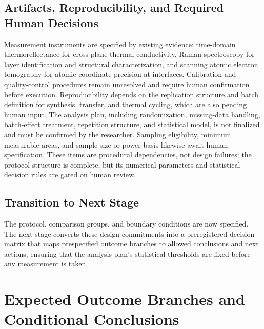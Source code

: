 \documentclass[conference]{IEEEtran}
\begin{document}
\subsection{Artifacts, Reproducibility, and Required Human Decisions}
Measurement instruments are specified by existing evidence: time-domain thermoreflectance for cross-plane thermal conductivity, Raman spectroscopy for layer identification and structural characterization, and scanning atomic electron tomography for atomic-coordinate precision at interfaces. Calibration and quality-control procedures remain unresolved and require human confirmation before execution. Reproducibility depends on the replication structure and batch definition for synthesis, transfer, and thermal cycling, which are also pending human input. The analysis plan, including randomization, missing-data handling, batch-effect treatment, repetition structure, and statistical model, is not finalized and must be confirmed by the researcher. Sampling eligibility, minimum measurable areas, and sample-size or power basis likewise await human specification. These items are procedural dependencies, not design failures; the protocol structure is complete, but its numerical parameters and statistical decision rules are gated on human review.~\cite{cite_26ecaf73d88dfe33,cite_9776eb140ec8227e,cite_b9cc1fcb55e94349}

\subsection{Transition to Next Stage}
The protocol, comparison groups, and boundary conditions are now specified. The next stage converts these design commitments into a preregistered decision matrix that maps prespecified outcome branches to allowed conclusions and next actions, ensuring that the analysis plan's statistical thresholds are fixed before any measurement is taken.

\section{Expected Outcome Branches and Conditional Conclusions}
\end{document}
